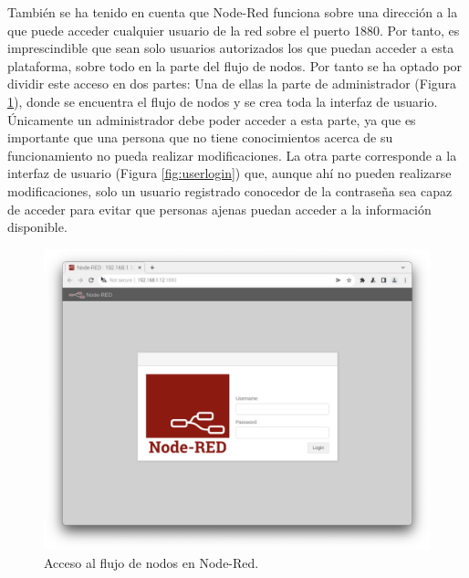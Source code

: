 También se ha tenido en cuenta que Node-Red funciona sobre una dirección a la que puede acceder cualquier usuario de la red sobre el puerto 1880. Por tanto, es imprescindible que sean solo usuarios autorizados los que puedan acceder a esta plataforma, sobre todo en la parte del flujo de nodos. Por tanto se ha optado por dividir este acceso en dos partes: Una de ellas la parte de administrador (Figura \ref{fig:adminlogin}), donde se encuentra el flujo de nodos y se crea toda la interfaz de usuario. Únicamente un administrador debe poder acceder a esta parte, ya que es importante que una persona que no tiene conocimientos acerca de su funcionamiento no pueda realizar modificaciones. La otra parte corresponde a la interfaz de usuario (Figura \ref{fig:userlogin}) que, aunque ahí no pueden realizarse modificaciones, solo un usuario registrado conocedor de la contraseña sea capaz de acceder para evitar que personas ajenas puedan acceder a la información disponible.\\
\begin{figure} [h!]
  \begin{center}
    \includegraphics[width=12cm]{figs/adminlogin}
  \end{center}
  \caption{Acceso al flujo de nodos en Node-Red.}
  \label{fig:adminlogin}
\end{figure}


